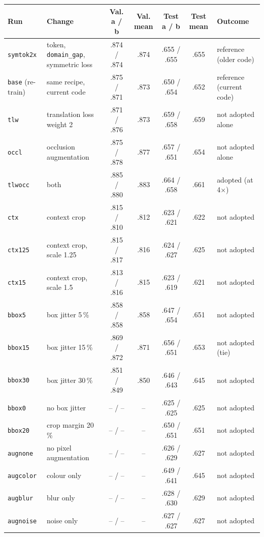 \begin{table}[t]
  \centering
  \small
  \begin{tabular}{@{}llccccl@{}}
    \toprule
    Run & Change & Val. a / b & Val. mean & Test a / b & Test mean & Outcome \\
    \midrule
    \texttt{symtok2x} & token, \texttt{domain\_gap}, symmetric loss & .874 / .874 & .874 & .655 / .655 & .655 & reference (older code) \\
    \texttt{base} (re-train) & same recipe, current code & .875 / .871 & .873 & .650 / .654 & .652 & reference (current code) \\
    \texttt{tlw} & translation loss weight 2 & .871 / .876 & .873 & .659 / .658 & .659 & not adopted alone \\
    \texttt{occl} & occlusion augmentation & .875 / .878 & .877 & .657 / .651 & .654 & not adopted alone \\
    \texttt{tlwocc} & both & .885 / .880 & .883 & .664 / .658 & .661 & adopted (at 4$\times$) \\
    \texttt{ctx} & context crop & .815 / .810 & .812 & .623 / .621 & .622 & not adopted \\
    \texttt{ctx125} & context crop, scale 1.25 & .815 / .817 & .816 & .624 / .627 & .625 & not adopted \\
    \texttt{ctx15} & context crop, scale 1.5 & .813 / .816 & .815 & .623 / .619 & .621 & not adopted \\
    \texttt{bbox5} & box jitter 5\,\% & .858 / .858 & .858 & .647 / .654 & .651 & not adopted \\
    \texttt{bbox15} & box jitter 15\,\% & .869 / .872 & .871 & .656 / .651 & .653 & not adopted (tie) \\
    \texttt{bbox30} & box jitter 30\,\% & .851 / .849 & .850 & .646 / .643 & .645 & not adopted \\
    \texttt{bbox0} & no box jitter & -- / -- & -- & .625 / .625 & .625 & not adopted \\
    \texttt{bbox20} & crop margin 20\,\% & -- / -- & -- & .650 / .651 & .651 & not adopted \\
    \texttt{augnone} & no pixel augmentation & -- / -- & -- & .626 / .629 & .627 & not adopted \\
    \texttt{augcolor} & colour only & -- / -- & -- & .649 / .641 & .645 & not adopted \\
    \texttt{augblur} & blur only & -- / -- & -- & .628 / .630 & .629 & not adopted \\
    \texttt{augnoise} & noise only & -- / -- & -- & .627 / .627 & .627 & not adopted \\

\end{tabular}
\end{table}
